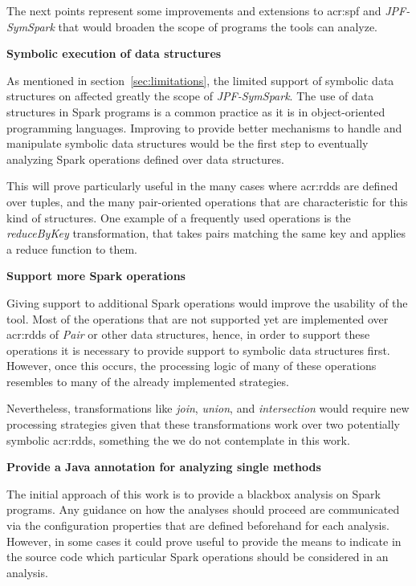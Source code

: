 

\label{sec:future}

The next points represent some improvements and extensions to \acrlong{acr:spf} and \textit{JPF-SymSpark} that would broaden the scope of programs the tools can analyze.

\textbf{Symbolic execution of data structures}

As mentioned in section~\ref{sec:limitations}, the limited support of symbolic data structures on \spf{} affected greatly the scope of \textit{JPF-SymSpark}. The use of data structures in Spark programs is a common practice as it is in object-oriented programming languages. Improving \spf{} to provide better mechanisms to handle and manipulate symbolic data structures would be the first step to eventually analyzing Spark operations defined over data structures.

This will prove particularly useful in the many cases where \acrshort{acr:rdd}s are defined over tuples, and the many pair-oriented operations that are characteristic for this kind of structures. One example of a frequently used operations is the \textit{reduceByKey} transformation, that takes pairs matching the same key and applies a reduce function to them.

\textbf{Support more Spark operations}

Giving support to additional Spark operations would improve the usability of the tool. Most of the operations that are not supported yet are implemented over \acrshort{acr:rdd}s of \textit{Pair} or other data structures, hence, in order to support these operations it is necessary to provide support to symbolic data structures first. However, once this occurs, the processing logic of many of these operations resembles to many of the already implemented strategies.

Nevertheless, transformations like \textit{join}, \textit{union}, and \textit{intersection} would require new processing strategies given that these transformations work over two potentially symbolic \acrshort{acr:rdd}s, something the we do not contemplate in this work.

\textbf{Provide a Java annotation for analyzing single methods}

The initial approach of this work is to provide a blackbox analysis on Spark programs. Any guidance on how the analyses should proceed are communicated via the configuration properties that are defined beforehand for each analysis. However, in some cases it could prove useful to provide the means to indicate in the source code which particular Spark operations should be considered in an analysis.

